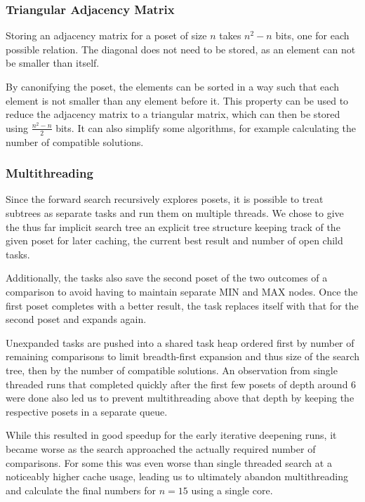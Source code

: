 \documentclass[10pt,journal,compsoc]{IEEEtran}
\begin{document}
\subsubsection{Triangular Adjacency Matrix}
Storing an adjacency matrix for a poset of size $n$ takes $n^2 - n$ bits, one for each possible relation.
The diagonal does not need to be stored, as an element can not be smaller than itself.

By canonifying the poset, the elements can be sorted in a way such that each element is not smaller than any element before it.
This property can be used to reduce the adjacency matrix to a triangular matrix, which can then be stored using $\frac{n^2 - n}{2}$ bits.
It can also simplify some algorithms, for example calculating the number of compatible solutions.

\subsubsection{Multithreading}

Since the forward search recursively explores posets, it is possible to treat subtrees as separate tasks and run them on multiple threads.
We chose to give the thus far implicit search tree an explicit tree structure keeping track of the given poset for later caching, the current best result and number of open child tasks.

Additionally, the tasks also save the second poset of the two outcomes of a comparison to avoid having to maintain separate
MIN and MAX nodes. Once the first poset completes with a better result, the task replaces itself with that for the second poset and expands again.

Unexpanded tasks are pushed into a shared task heap ordered first by number of remaining comparisons to limit breadth-first expansion and thus size of the search tree, then by the number of compatible solutions.
An observation from single threaded runs that completed quickly after the first few posets of depth around $6$ were done also led us to prevent multithreading above that depth by keeping the respective posets in a separate queue.

While this resulted in good speedup for the early iterative deepening runs, it became worse as the search approached the actually required number of comparisons.
For some this was even worse than single threaded search at a noticeably higher cache usage, leading us to ultimately abandon multithreading and calculate the final numbers for $n = 15$ using a single core.
\end{document}
